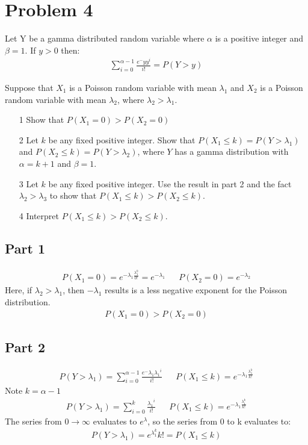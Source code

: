 \documentclass{article}
\begin{document}
\clearpage
\section*{Problem 4}
Let Y be a gamma distributed random variable where $\alpha$ is a positive integer and $\beta=1$. If $y>0$ then:
\begin{align*}
\sum_{i=0}^{\alpha-1} \frac{e^-y y^i}{i!} = P(Y>y)
\end{align*}

Suppose that $X_1$ is a Poisson random variable with mean $\lambda_1$ and $X_2$ is a Poisson random variable with mean $\lambda_2$, where $\lambda_2>\lambda_1$.

\begin{enumerate}
\item[1] Show that $P(X_1=0) > P(X_2=0)$
\item[2]  Let $k$ be any fixed positive integer. Show that $P(X_1 \leq k) = P(Y > \lambda_1)$ and $P(X_2 \leq k) = P(Y>\lambda_2)$, where $Y$ has a gamma distribution with $\alpha=k+1$ and $\beta= 1$.
\item[3] Let $k$ be any fixed positive integer. Use the result in part 2 and the fact $\lambda_2 > \lambda_3$ to show that $P(X_1 \leq k) > P(X_2 \leq k)$.
\item[4] Interpret $P(X_1 \leq k) > P(X_2 \leq k)$.
\end{enumerate}
\subsection*{Part 1}
\begin{align*}
P(X_1 = 0) = e^{-\lambda_1 \frac{\lambda_1^{0}}{0!}} = e^{-\lambda_1} && P(X_2 = 0) = e^{-\lambda_2}
\end{align*}
Here, if $\lambda_2>\lambda_1$, then $-\lambda_1$ results is a less negative exponent for the Poisson distribution.
\begin{align*}
P(X_1 = 0) > P(X_2=0)
\end{align*}
\subsection*{Part 2}
\begin{align*}
P(Y > \lambda_1) = \sum_{i=0}^{\alpha-1} \frac{e^-{\lambda_1} {\lambda_1}^i}{i!} && P(X_1 \leq k) = e^{-\lambda_1 \frac{\lambda_1^{k}}{k!}}
\end{align*}
Note $k = \alpha-1$
\begin{align*}
P(Y > \lambda_1) = \sum_{i=0}^{k} \frac{{\lambda_1}^i}{i!} && P(X_1 \leq k) = e^{-\lambda_1 \frac{\lambda_1^{k}}{k!}}
\end{align*}
The series from $0 \rightarrow \infty$ evaluates to $e^{\lambda}$, so the series from 0 to k evaluates to:
\begin{align*}
\boxed{ P(Y > \lambda_1) = e^{\lambda_1^{k}}{k!} = P(X_1 \leq k) }
\end{align*}
\end{document}
